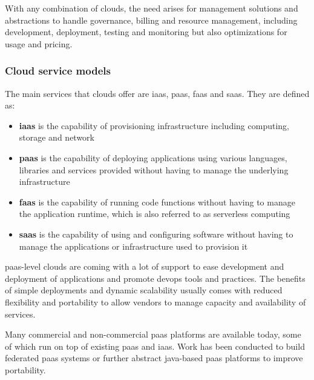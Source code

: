 \documentclass[../main.tex]{subfiles}
\begin{document}
    With any combination of \glspl{cloud}, the need arises for management solutions and abstractions to handle governance, billing and resource management, including development, deployment, testing and monitoring but also optimizations for usage and pricing.\cite{rw_comparison_mcmp}

    \subsubsection{Cloud service models}
    \label{subsubsec:defs-cloud-service-model}

    The main services that \glspl{cloud} offer are \acrfull{iaas}, \acrfull{paas}, \acrfull{faas} and \acrfull{saas}\@.
    They are defined as\cite{cloud_def_nist,cloud_def_nist_eval,faas_status}:
    \begin{itemize}
        \setlength\itemsep{0em}
        \item \textbf{\acrshort{iaas}} is the capability of provisioning infrastructure including computing, storage and network
        \item \textbf{\acrshort{paas}} is the capability of deploying applications using various languages, libraries and services provided without having to manage the underlying infrastructure
        \item \textbf{\acrshort{faas}} is the capability of running code functions without having to manage the application runtime, which is also referred to as serverless computing
        \item \textbf{\acrshort{saas}} is the capability of using and configuring software without having to manage the applications or infrastructure used to provision it
    \end{itemize}

    \acrshort{paas}-level \glspl{cloud} are coming with a lot of support to ease development and deployment of applications and promote \gls{devops} tools and practices.
    The benefits of simple deployments and dynamic scalability usually comes with reduced flexibility and portability to allow vendors to manage capacity and availability of services.\cite{cd_cloud_computing}

    Many commercial and non-commercial \acrshort{paas} platforms are available today, some of which run on top of existing \acrshort{paas} and \acrshort{iaas}\cite{paas_players}.
    Work has been conducted to build federated \acrshort{paas} systems\cite{federated_paas} or further abstract \gls{java}-based \acrshort{paas} platforms\cite{policy_driven_hc_mw} to improve portability.
\end{document}
